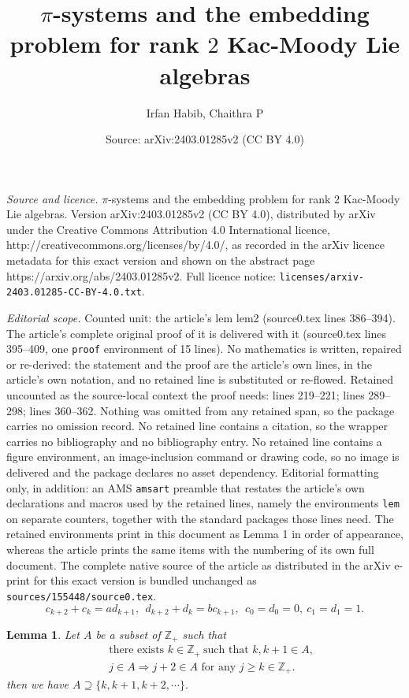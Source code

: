 \documentclass[10pt,a4paper]{amsart}
\title{$\pi$-systems and the embedding problem for rank $2$ Kac-Moody Lie algebras}
\author{Irfan Habib, Chaithra P}
\date{Source: arXiv:2403.01285v2 (CC BY 4.0)}
\newtheorem{lem}{Lemma}
\newcommand\bz{\mathbb Z}
\begin{document}
\maketitle

\noindent\emph{Source and licence.} $\pi$-systems and the embedding problem for rank $2$ Kac-Moody Lie algebras. Version arXiv:2403.01285v2 (CC BY 4.0), distributed by arXiv under the Creative Commons Attribution 4.0 International licence, http://creativecommons.org/licenses/by/4.0/, as recorded in the arXiv licence metadata for this exact version and shown on the abstract page https://arxiv.org/abs/2403.01285v2. Full licence notice: \texttt{licenses/arxiv-2403.01285-CC-BY-4.0.txt}.\par\smallskip

\noindent\textit{Editorial scope.} Counted unit: the article's lem lem2 (source0.tex lines 386--394). The article's complete original proof of it is delivered with it (source0.tex lines 395--409, one \texttt{proof} environment of 15 lines). No mathematics is written, repaired or re-derived: the statement and the proof are the article's own lines, in the article's own notation, and no retained line is substituted or re-flowed.  Retained uncounted as the source-local context the proof needs: lines 219--221; lines 289--298; lines 360--362.  Nothing was omitted from any retained span, so the package carries no omission record.  No retained line contains a citation, so the wrapper carries no bibliography and no bibliography entry.  No retained line contains a figure environment, an image-inclusion command or drawing code, so no image is delivered and the package declares no asset dependency.  Editorial formatting only, in addition: an AMS \texttt{amsart} preamble that restates the article's own declarations and macros used by the retained lines, namely the environments \texttt{lem} on separate counters, together with the standard packages those lines need.  The retained environments print in this document as Lemma 1 in order of appearance, whereas the article prints the same items with the numbering of its own full document.  The complete native source of the article as distributed in the arXiv e-print for this exact version is bundled unchanged as \texttt{sources/155448/source0.tex}.
\begin{equation}\label{recurrenceab}
  c_{k+2}+c_k=ad_{k+1},\ \ d_{k+2}+d_k=bc_{k+1},\ \ c_0=d_0=0,\ c_1=d_1=1.
\end{equation}

\begin{lem}\label{lemstar}
    Let $A$ be a subset of $\bz_+$ such that 
\begin{equation}\label{propstar}
\begin{split}
    &\ \ \text{there exists }k\in \bz_+\ \text{such that }k,k+1\in A,\\
    &\ \ j\in A\Longrightarrow j+2\in A\text{ for any }j\geq k\in \bz_+.
\end{split}\tag{$\star$}
\end{equation}
then we have $A\supseteq \{k,k+1,k+2,\cdots\}.$
\end{lem}
\end{document}
